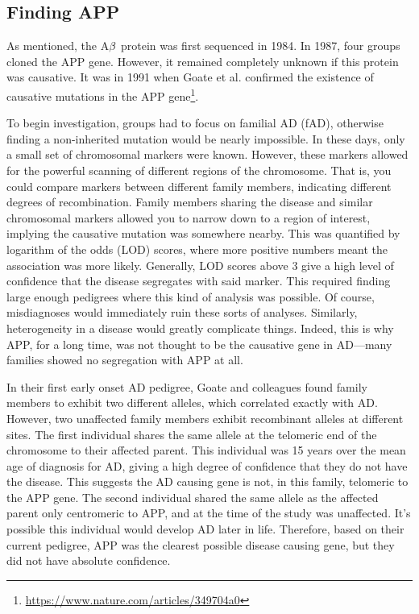 \subsection*{Finding APP}


As mentioned, the A$\beta$ protein was first sequenced in 1984. In 1987, four groups cloned the APP gene. However, it remained completely unknown if this protein was causative. It was in 1991 when Goate et al. confirmed the existence of causative mutations in the APP gene\footnote{\url{https://www.nature.com/articles/349704a0}}.\newline

To begin investigation, groups had to focus on familial AD (fAD), otherwise finding a non-inherited mutation would be nearly impossible. In these days, only a small set of chromosomal markers were known. However, these markers allowed for the powerful scanning of different regions of the chromosome. That is, you could compare markers between different family members, indicating different degrees of recombination. Family members sharing the disease and similar chromosomal markers allowed you to narrow down to a region of interest, implying the causative mutation was somewhere nearby. This was quantified by logarithm of the odds (LOD) scores, where more positive numbers meant the association was more likely. Generally, LOD scores above 3 give a high level of confidence that the disease segregates with said marker. This required finding large enough pedigrees where this kind of analysis was possible. Of course, misdiagnoses would immediately ruin these sorts of analyses. Similarly, heterogeneity in a disease would greatly complicate things. Indeed, this is why APP, for a long time, was not thought to be the causative gene in AD---many families showed no segregation with APP at all. \newline

In their first early onset AD pedigree, Goate and colleagues found family members to exhibit two different alleles, which correlated exactly with AD. However, two unaffected family members exhibit recombinant alleles at different sites. The first individual shares the same allele at the telomeric end of the chromosome to their affected parent. This individual was 15 years over the mean age of diagnosis for AD, giving a high degree of confidence that they do not have the disease. This suggests the AD causing gene is not, in this family, telomeric to the APP gene. The second individual shared the same allele as the affected parent only centromeric to APP, and at the time of the study was unaffected. It's possible this individual would develop AD later in life. Therefore, based on their current pedigree, APP was the clearest possible disease causing gene, but they did not have absolute confidence.\newline

